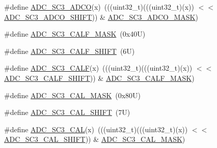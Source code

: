 \begin{DoxyCompactItemize}
\#define \mbox{\hyperlink{group___a_d_c___register___masks_gaa0533bb7840bfc57b7f764013808b74d}{A\+D\+C\+\_\+\+S\+C3\+\_\+\+A\+D\+CO}}(x)~(((uint32\+\_\+t)(((uint32\+\_\+t)(x)) $<$$<$ \mbox{\hyperlink{group___a_d_c___register___masks_ga8e5f5e3a1378880d2a03d1662f39c308}{A\+D\+C\+\_\+\+S\+C3\+\_\+\+A\+D\+C\+O\+\_\+\+S\+H\+I\+FT}})) \& \mbox{\hyperlink{group___a_d_c___register___masks_ga9054cd805b818a928ca4309c717466db}{A\+D\+C\+\_\+\+S\+C3\+\_\+\+A\+D\+C\+O\+\_\+\+M\+A\+SK}})
\item 
\#define \mbox{\hyperlink{group___a_d_c___register___masks_ga3a706436447b6113727826e303c3fbe6}{A\+D\+C\+\_\+\+S\+C3\+\_\+\+C\+A\+L\+F\+\_\+\+M\+A\+SK}}~(0x40\+U)
\item 
\#define \mbox{\hyperlink{group___a_d_c___register___masks_ga9fd60a35fc4c15b563078ecbd3eaa449}{A\+D\+C\+\_\+\+S\+C3\+\_\+\+C\+A\+L\+F\+\_\+\+S\+H\+I\+FT}}~(6\+U)
\item 
\#define \mbox{\hyperlink{group___a_d_c___register___masks_ga671f5531ad1accd17cbea2f319523a2d}{A\+D\+C\+\_\+\+S\+C3\+\_\+\+C\+A\+LF}}(x)~(((uint32\+\_\+t)(((uint32\+\_\+t)(x)) $<$$<$ \mbox{\hyperlink{group___a_d_c___register___masks_ga9fd60a35fc4c15b563078ecbd3eaa449}{A\+D\+C\+\_\+\+S\+C3\+\_\+\+C\+A\+L\+F\+\_\+\+S\+H\+I\+FT}})) \& \mbox{\hyperlink{group___a_d_c___register___masks_ga3a706436447b6113727826e303c3fbe6}{A\+D\+C\+\_\+\+S\+C3\+\_\+\+C\+A\+L\+F\+\_\+\+M\+A\+SK}})
\item 
\#define \mbox{\hyperlink{group___a_d_c___register___masks_ga0ec589c9101684eeac4af85452ed3673}{A\+D\+C\+\_\+\+S\+C3\+\_\+\+C\+A\+L\+\_\+\+M\+A\+SK}}~(0x80\+U)
\item 
\#define \mbox{\hyperlink{group___a_d_c___register___masks_ga808101f85e6ceff194c212faacf4bd9d}{A\+D\+C\+\_\+\+S\+C3\+\_\+\+C\+A\+L\+\_\+\+S\+H\+I\+FT}}~(7\+U)
\item 
\#define \mbox{\hyperlink{group___a_d_c___register___masks_ga1bfd643a932720e0eba32688dca9c795}{A\+D\+C\+\_\+\+S\+C3\+\_\+\+C\+AL}}(x)~(((uint32\+\_\+t)(((uint32\+\_\+t)(x)) $<$$<$ \mbox{\hyperlink{group___a_d_c___register___masks_ga808101f85e6ceff194c212faacf4bd9d}{A\+D\+C\+\_\+\+S\+C3\+\_\+\+C\+A\+L\+\_\+\+S\+H\+I\+FT}})) \& \mbox{\hyperlink{group___a_d_c___register___masks_ga0ec589c9101684eeac4af85452ed3673}{A\+D\+C\+\_\+\+S\+C3\+\_\+\+C\+A\+L\+\_\+\+M\+A\+SK}})
\end{DoxyCompactItemize}
